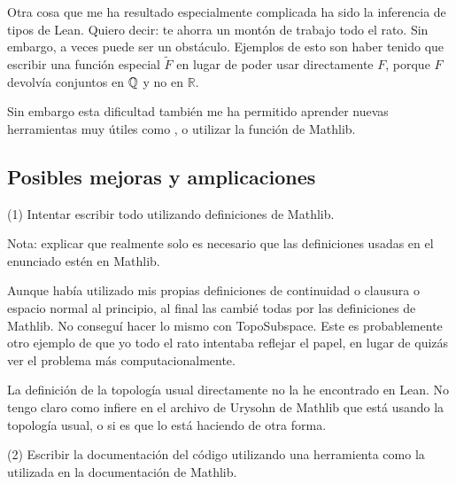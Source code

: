Otra cosa que me ha resultado especialmente complicada ha sido la inferencia de tipos de Lean. Quiero decir: te ahorra un montón de trabajo todo el rato. Sin embargo, a veces puede ser un obstáculo. Ejemplos de esto son haber tenido que escribir una función especial $\tilde{F}$ en lugar de poder usar directamente $F$, porque $F$ devolvía conjuntos en $\mathbb{Q}$ y no en $\mathbb{R}$.

Sin embargo esta dificultad también me ha permitido aprender nuevas herramientas muy útiles como , o utilizar la función  de Mathlib.

\subsection{Posibles mejoras y amplicaciones}

(1) Intentar escribir todo utilizando definiciones de Mathlib.

Nota: explicar que realmente solo es necesario que las definiciones usadas en el enunciado estén en Mathlib.

Aunque había utilizado mis propias definiciones de continuidad o clausura o espacio normal al principio, al final las cambié todas por las definiciones de Mathlib. No conseguí hacer lo mismo con TopoSubspace. Este es probablemente otro ejemplo de que yo todo el rato intentaba reflejar el papel, en lugar de quizás ver el problema más computacionalmente.

La definición de la topología usual directamente no la he encontrado en Lean. No tengo claro como infiere en el archivo de Urysohn de Mathlib que está usando la topología usual, o si es que lo está haciendo de otra forma.

(2) Escribir la documentación del código utilizando una herramienta como la utilizada en la documentación de Mathlib.